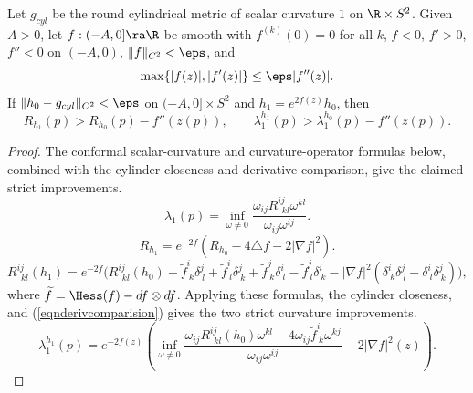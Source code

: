 \begin{lemma}
  \label{lem:kl-surgery-pinching-condition-ricci-flow-surgery-lemma}
\label{lemroundoff}
Let $g_{cyl}$ be the round cylindrical metric of scalar curvature $1$ on
$\R\times S^2$. Given $A>0$, let $f:(-A,0]\ra\R$ be smooth with
$f^{(k)}(0)=0$ for all $k$, $f<0$, $f'>0$, $f''<0$ on $(-A,0)$,
$\|f\|_{C^2}<\eps$, and
\begin{equation}
\label{eqnderivcomparision}
\max\{|f(z)|,|f'(z)|\}\leq\eps|f''(z)|.
\end{equation}
If $\|h_0-g_{cyl}\|_{C^2}<\eps$ on $(-A,0]\times S^2$ and
$h_1=e^{2f(z)}h_0$, then
\[
R_{h_1}(p)>R_{h_0}(p)-f''(z(p)),\qquad
\lambda_1^{h_1}(p)>\lambda_1^{h_0}(p)-f''(z(p)).
\]
\end{lemma}
\begin{proof}
\sketch The conformal scalar-curvature and curvature-operator formulas below,
combined with the cylinder closeness and derivative comparison, give the
claimed strict improvements.
\begin{equation} \label{Rvar}
\lambda_1(p)=\inf_{\omega\ne0}
\frac{\omega_{ij}R^{ij}_{\ \ kl}\omega^{kl}}{\omega_{ij}\omega^{ij}}.
\end{equation}
\begin{equation} \label{confscalar}
R_{h_1}=e^{-2f}(R_{h_0}-4\triangle f-2|\nabla f|^2).
\end{equation}
\begin{equation} \label{confcurv}
R^{ij}_{\ \ kl}(h_1)=e^{-2f}\bigl(R^{ij}_{\ \ kl}(h_0)
-\widetilde f^i_{\ k}\delta^j_{\ l}+\widetilde f^i_{\ l}\delta^j_{\ k}
+\widetilde f^j_{\ k}\delta^i_{\ l}-\widetilde f^j_{\ l}\delta^i_{\ k}
-|\nabla f|^2(\delta^i_{\ k}\delta^j_{\ l}-\delta^i_{\ l}\delta^j_{\ k})\bigr),
\end{equation}
where $\widetilde f=\Hess(f)-df\otimes df$. Applying these formulas,
the cylinder closeness, and (\ref{eqnderivcomparision}) gives the two
strict curvature improvements.
\begin{equation} \label{min1}
\lambda_1^{h_1}(p)=e^{-2f(z)}\left(\inf_{\omega\ne0}
\frac{\omega_{ij}R^{ij}_{\ \ kl}(h_0)\omega^{kl}
-4\omega_{ij}\widetilde f^i_{\ k}\omega^{kj}}{\omega_{ij}\omega^{ij}}
-2|\nabla f|^2(z)\right).
\end{equation}
\end{proof}

